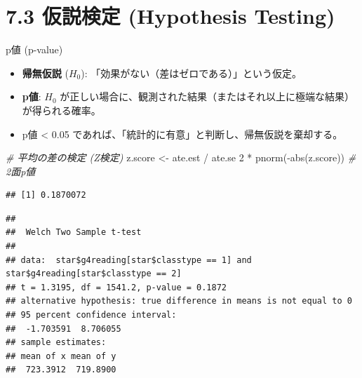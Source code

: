 \documentclass[
  ignorenonframetext,
]{beamer}
\newenvironment{Shaded}{\begin{snugshade}}{\end{snugshade}}
\newcommand{\CommentTok}[1]{\textcolor[rgb]{0.56,0.35,0.01}{\textit{#1}}}
\newcommand{\DecValTok}[1]{\textcolor[rgb]{0.00,0.00,0.81}{#1}}
\newcommand{\FunctionTok}[1]{\textcolor[rgb]{0.00,0.00,0.00}{#1}}
\newcommand{\NormalTok}[1]{#1}
\newcommand{\OtherTok}[1]{\textcolor[rgb]{0.56,0.35,0.01}{#1}}
\newcommand{\SpecialCharTok}[1]{\textcolor[rgb]{0.00,0.00,0.00}{#1}}
\providecommand{\tightlist}{%
  \setlength{\itemsep}{0pt}\setlength{\parskip}{0pt}}
\begin{document}
\hypertarget{ux4eeeux8aacux691cux5b9a-hypothesis-testing}{%
\section{7.3 仮説検定 (Hypothesis
Testing)}\label{ux4eeeux8aacux691cux5b9a-hypothesis-testing}}

\begin{frame}[fragile]{p値 (p-value)}
\protect\hypertarget{pux5024-p-value}{}
\begin{itemize}
\tightlist
\item
  \textbf{帰無仮説} (\(H_0\)):
  「効果がない（差はゼロである）」という仮定。
\item
  \textbf{p値}: \(H_0\)
  が正しい場合に、観測された結果（またはそれ以上に極端な結果）が得られる確率。
\item
  p値 \textless{} 0.05
  であれば、「統計的に有意」と判断し、帰無仮説を棄却する。
\end{itemize}

\scriptsize

\begin{Shaded}
\begin{Highlighting}[]
\CommentTok{\# 平均の差の検定 (Z検定)}
\NormalTok{z.score }\OtherTok{\textless{}{-}}\NormalTok{ ate.est }\SpecialCharTok{/}\NormalTok{ ate.se}
\DecValTok{2} \SpecialCharTok{*} \FunctionTok{pnorm}\NormalTok{(}\SpecialCharTok{{-}}\FunctionTok{abs}\NormalTok{(z.score)) }\CommentTok{\# 2面p値}
\end{Highlighting}
\end{Shaded}

\begin{verbatim}
## [1] 0.1870072
\end{verbatim}

\begin{Shaded}
\end{Shaded}

\begin{verbatim}
## 
##  Welch Two Sample t-test
## 
## data:  star$g4reading[star$classtype == 1] and star$g4reading[star$classtype == 2]
## t = 1.3195, df = 1541.2, p-value = 0.1872
## alternative hypothesis: true difference in means is not equal to 0
## 95 percent confidence interval:
##  -1.703591  8.706055
## sample estimates:
## mean of x mean of y 
##  723.3912  719.8900
\end{verbatim}

\normalsize
\end{frame}
\end{document}
